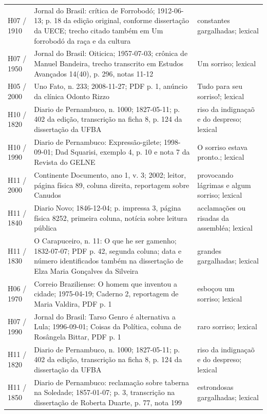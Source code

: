 \begin{longtable}{>{\raggedright\arraybackslash}p{}>{\raggedright\arraybackslash}p{}>{\raggedright\arraybackslash}p{}}
H07 / 1910 & Jornal do Brasil: crítica de Forrobodó; 1912-06-13; p. 18 da edição original, conforme dissertação da UECE; trecho citado também em Um forrobodó da raça e da cultura & constantes gargalhadas; lexical \cite{acervoD104} \\
H07 / 1950 & Jornal do Brasil: Oiticica; 1957-07-03; crônica de Manuel Bandeira, trecho transcrito em Estudos Avançados 14(40), p. 296, notas 11-12 & Um sorriso; lexical \cite{acervoD105} \\
H05 / 2000 & Uno Fato, n. 233; 2008-11-27; PDF p. 1, anúncio da clínica Odonto Rizzo & Tudo para seu sorriso!; lexical \cite{acervoD106} \\
H10 / 1820 & Diario de Pernambuco, n. 1000; 1827-05-11; p. 402 da edição, transcrição na ficha 8, p. 124 da dissertação da UFBA & riso da indignaçaõ e do despreso; lexical \cite{acervoD107} \\
H10 / 1990 & Diario de Pernambuco: Expressão-gilete; 1998-09-01; Dad Squarisi, exemplo 4, p. 10 e nota 7 da Revista do GELNE & O sorriso estava pronto.; lexical \cite{acervoD108} \\
H11 / 2000 & Continente Documento, ano 1, v. 3; 2002; leitor, página física 89, coluna direita, reportagem sobre Canudos & provocando lágrimas e algum sorriso; lexical \cite{acervoD109} \\
H11 / 1840 & Diario Novo; 1846-12-04; p. impressa 3, página física 8252, primeira coluna, notícia sobre leitura pública & acclamações ou risadas da assembléa; lexical \cite{acervoD110} \\
H11 / 1830 & O Carapuceiro, n. 11: O que he ser gamenho; 1832-07-07; PDF p. 42, segunda coluna; data e número identificados também na dissertação de Elza Maria Gonçalves da Silveira & grandes gargalhadas; lexical \cite{acervoD111} \\
H06 / 1970 & Correio Braziliense: O homem que inventou a cidade; 1975-04-19; Caderno 2, reportagem de Maria Valdira, PDF p. 1 & esboçou um sorriso; lexical \cite{acervoD112} \\
H07 / 1990 & Jornal do Brasil: Tarso Genro é alternativa a Lula; 1996-09-01; Coisas da Política, coluna de Rosângela Bittar, PDF p. 1 & raro sorriso; lexical \cite{acervoD113} \\
H11 / 1820 & Diario de Pernambuco, n. 1000; 1827-05-11; p. 402 da edição, transcrição na ficha 8, p. 124 da dissertação da UFBA & riso da indignaçaõ e do despreso; lexical \cite{acervoD107} \\
H11 / 1850 & Diario de Pernambuco: reclamação sobre taberna na Soledade; 1857-01-07; p. 3, transcrição na dissertação de Roberta Duarte, p. 77, nota 199 & estrondosas gargalhadas; lexical \cite{acervoD115} \\

\end{longtable}
